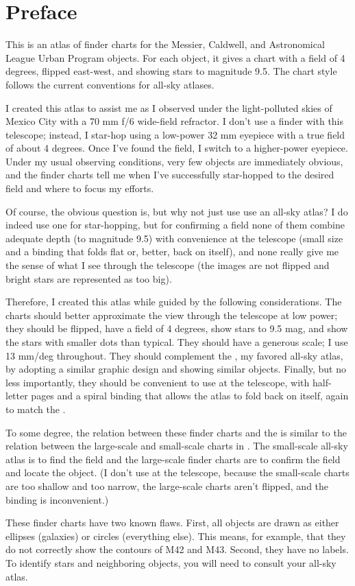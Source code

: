 
\chapter*{Preface}

This is an atlas of finder charts for the Messier, Caldwell, and Astronomical League Urban Program objects. For each object, it gives a chart with a field of 4 degrees, flipped east-west, and showing stars to magnitude 9.5. The chart style follows the current conventions for all-sky atlases.

I created this atlas to assist me as I observed under the light-polluted skies of Mexico City with a 70 mm f/6 wide-field refractor. I don't use a finder with this telescope; instead, I star-hop using a low-power 32 mm eyepiece with a true field of about 4 degrees. Once I’ve found the field, I switch to a higher-power eyepiece. Under my usual observing conditions, very few objects are immediately obvious, and the finder charts tell me when I've successfully star-hopped to the desired field and where to focus my efforts.

Of course, the obvious question is, but why not just use use an all-sky atlas? I do indeed use one for star-hopping, but for confirming a field none of them combine adequate depth (to magnitude 9.5) with convenience at the telescope (small size and a binding that folds flat or, better, back on itself), and none really give me the sense of what I see through the telescope (the images are not flipped and bright stars are represented as too big).

Therefore, I created this atlas while guided by the following considerations. The charts should better approximate the view through the telescope at low power; they should be flipped, have a field of 4 degrees, show stars to 9.5 mag, and show the stars with smaller dots than typical.
They should have a generous scale; I use 13 mm/deg throughout.
They should complement the {\PSA}, my favored all-sky atlas, by adopting a similar graphic design and showing similar objects.  
Finally, but no less importantly, they should be convenient to use at the telescope, with half-letter pages and a spiral binding that allows the atlas to fold back on itself, again to match the {\PSA}.

To some degree, the relation between these finder charts and the {\PSA} is similar to the relation between the large-scale and small-scale charts in . The small-scale all-sky atlas is to find the field and the large-scale finder charts are to confirm the field and locate the object. (I don’t use  at the telescope, because the small-scale charts are too shallow and too narrow, the large-scale charts aren’t flipped, and the binding is inconvenient.) 

These finder charts have two known flaws. First, all objects are drawn as either ellipses (galaxies) or circles (everything else). This means, for example, that they do not correctly show the contours of M42 and M43. Second, they have no labels. To identify stars and neighboring objects, you will need to consult your all-sky atlas.

